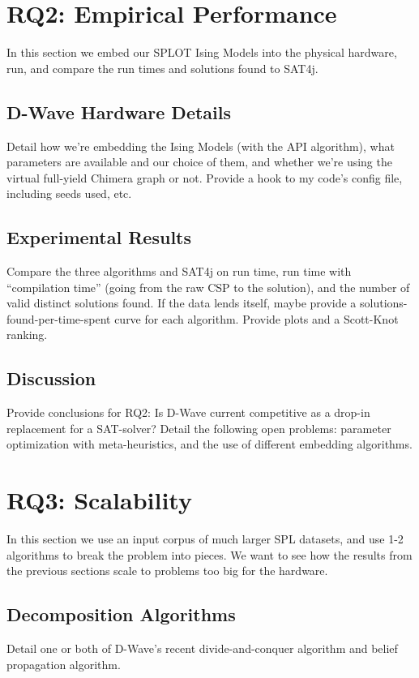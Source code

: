 \documentclass{sig-alternate-05-2015}
\begin{document}
\section{RQ2: Empirical Performance}
In this section we embed our SPLOT Ising Models into the physical hardware, run, and compare the run times and solutions found to SAT4j.

\subsection{D-Wave Hardware Details}
Detail how we're embedding the Ising Models (with the API algorithm), what parameters are available and our choice of them, and whether we're using the virtual full-yield Chimera graph or not. Provide a hook to my code's config file, including seeds used, etc.

\subsection{Experimental Results}
Compare the three algorithms and SAT4j on run time, run time with ``compilation time'' (going from the raw CSP to the solution), and the number of valid distinct solutions found. If the data lends itself, maybe provide a solutions-found-per-time-spent curve for each algorithm. Provide plots and a Scott-Knot ranking.

\subsection{Discussion}
Provide conclusions for RQ2: Is D-Wave current competitive as a drop-in replacement for a SAT-solver? Detail the following open problems: parameter optimization with meta-heuristics, and the use of different embedding algorithms.


\section{RQ3: Scalability}
In this section we use an input corpus of much larger SPL datasets, and use 1-2 algorithms to break the problem into pieces. We want to see how the results from the previous sections scale to problems too big for the hardware.

\subsection{Decomposition Algorithms}
Detail one or both of D-Wave's recent divide-and-conquer algorithm and belief propagation algorithm.
\end{document}
